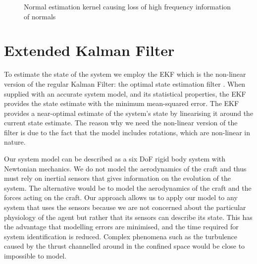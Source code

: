 \documentclass[]{article}
\begin{document}
{\begin{figure}[tbp]
	\caption{Normal estimation kernel causing loss of high frequency information of normals}
	\label{fig:spurious_plane_normals}
\end{figure}




\clearpage %
\section{Extended Kalman Filter} %
\label{sec:ekf}

To estimate the state of the system we employ the \ac{EKF} which is the non-linear version of the regular Kalman Filter: the optimal state estimation filter \cite{todo}. When supplied with an accurate system model, and its statistical properties, the EKF provides the state estimate with the minimum mean-squared error.
The \ac{EKF} provides a near-optimal estimate of the system's state by linearising it around the current state estimate. The reason why we need the non-linear version of the filter is due to the fact that the model includes rotations, which are non-linear in nature.


Our system model can be described as a six \ac{DoF} rigid body system with Newtonian mechanics. We do not model the aerodynamics of the craft and thus must rely on inertial sensors that gives information on the evolution of the system\cite{OpenPilotPaper}. The alternative would be to model the aerodynamics of the craft and the forces acting on the craft. Our approach allows us to apply our model to any system that uses the sensors because we are not concerned about the particular physiology of the agent but rather that its sensors can describe its state.
This has the advantage that modelling errors are minimised, and the time required for system identification is reduced.
Complex phenomena such as the turbulence caused by the thrust channelled around in the confined space would be close to impossible to model.

}
\end{document}
